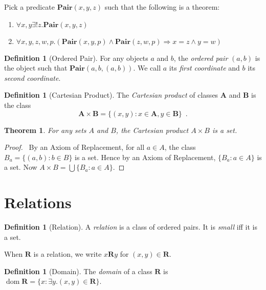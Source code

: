 \documentclass{report}
\newtheorem{theorem}[axiom]{Theorem}
\theoremstyle{definition}
\newtheorem{definition}[axiom]{Definition}
\newcommand{\dom}{\ensuremath{\operatorname{dom}}}
\begin{document}
    Pick a predicate $\mathbf{Pair}(x,y,z)$ such that the following is a theorem:
    \begin{enumerate}
        \item $\forall x,y \exists ! z. \mathbf{Pair}(x,y,z)$
        \item $\forall x,y,z,w,p. (\mathbf{Pair}(x,y,p) \wedge \mathbf{Pair}(z,w,p) \Rightarrow x = z \wedge y = w)$
    \end{enumerate}

    \begin{definition}[Ordered Pair]
        For any objects $a$ and $b$, the \emph{ordered pair} $(a,b)$ is the object such
        that $\mathbf{Pair}(a,b,(a,b))$.
        We call $a$ its \emph{first coordinate} and $b$ its \emph{second coordinate}.
    \end{definition}

    \begin{definition}[Cartesian Product]
        The \emph{Cartesian product} of classes $\mathbf{A}$ and $\mathbf{B}$ is the class
        \[ \mathbf{A} \times \mathbf{B} = \{ (x,y) : x \in \mathbf{A}, y \in \mathbf{B} \} \enspace . \]
    \end{definition}

    \begin{theorem}
        For any sets $A$ and $B$, the Cartesian product $A \times B$ is a set.
    \end{theorem}

    \begin{proof}
        \pf\ By an Axiom of Replacement, for all $a \in A$, the class $B_a = \{ (a,b) : b \in B \}$ is a
        set. Hence by an Axiom of Replacement, $\{ B_a : a \in A \}$ is a set. Now $A \times B =
        \bigcup \{ B_a : a \in A \}$.
    \end{proof}

    \section{Relations}

    \begin{definition}[Relation]
        A \emph{relation} is a class of ordered pairs. It is \emph{small} iff it is a set.

        When $\mathbf{R}$ is a relation, we write $x \mathbf{R} y$ for $(x,y) \in \mathbf{R}$.
    \end{definition}

    \begin{definition}[Domain]
        The \emph{domain} of a class $\mathbf{R}$ is $\dom \mathbf{R} = \{ x : \exists y. (x,y) \in \mathbf{R} \}$.
    \end{definition}
\end{document}

